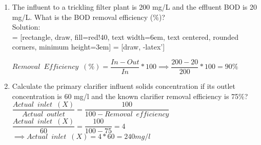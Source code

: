 \begin{enumerate}

\item The influent to a trickling filter plant is 200 mg/L and the effluent BOD is 20 mg/L. What is the BOD removal efficiency (\%)?\\
Solution:\\
\vspace{0.3cm}
 = [rectangle, draw, fill=red!40, 
    text width=6em, text centered, rounded corners, minimum height=3em]
 = [draw, -latex']
\begin{figure}[!h]
\centering
{}
\end{figure}
\vspace{0.5cm}
$Removal \enspace Efficiency \enspace (\%) = \dfrac{In-Out}{In}*100 \implies \dfrac{200-20}{200}*100=\boxed{90\%}$




\item Calculate the primary clarifier influent solids concentration if its outlet concentration is 60 mg/l and the known clarifier removal efficiency is 75\%?\\
$\dfrac{Actual \enspace  inlet \enspace (X)}{Actual \enspace outlet}=\dfrac{100}{100-Removal \enspace efficiency}$\\ 
$\dfrac{Actual \enspace  inlet \enspace (X)}{60}=\dfrac{100}{100-75}=4$\\
$\implies Actual \enspace inlet \enspace (X)=4*60 = \boxed{240 mg/l}$\\


\end{enumerate}

